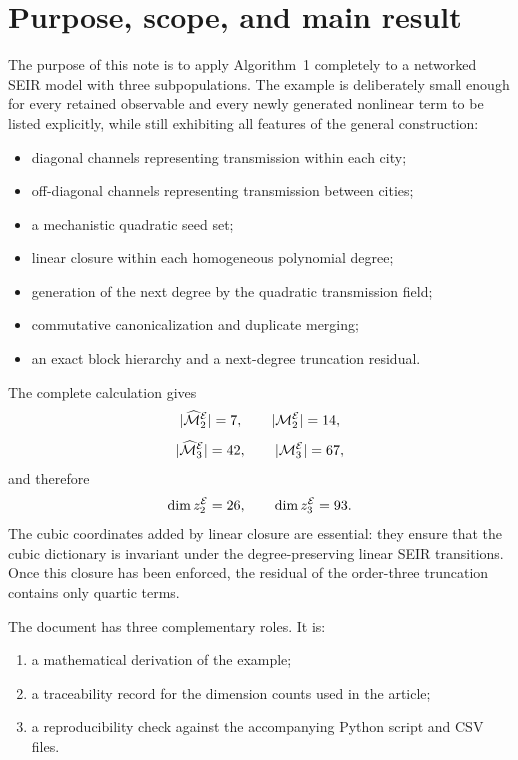 \section{Purpose, scope, and main result}
\label{sec:purpose}

The purpose of this note is to apply Algorithm~1 completely to a networked
SEIR model with three subpopulations. The example is deliberately small enough
for every retained observable and every newly generated nonlinear term to be
listed explicitly, while still exhibiting all features of the general
construction:

\begin{itemize}[leftmargin=2em]
\item diagonal channels representing transmission within each city;
\item off-diagonal channels representing transmission between cities;
\item a mechanistic quadratic seed set;
\item linear closure within each homogeneous polynomial degree;
\item generation of the next degree by the quadratic transmission field;
\item commutative canonicalization and duplicate merging;
\item an exact block hierarchy and a next-degree truncation residual.
\end{itemize}

The complete calculation gives
\[
|\widehat{\mathcal M}_2^{\mathcal{E}}|=7,
\qquad
|\mathcal M_2^{\mathcal{E}}|=14,
\]
\[
|\widehat{\mathcal M}_3^{\mathcal{E}}|=42,
\qquad
|\mathcal M_3^{\mathcal{E}}|=67,
\]
and therefore
\[
\dim z_2^{\mathcal{E}}=26,
\qquad
\dim z_3^{\mathcal{E}}=93.
\]
The \NumMthreeClosure{} cubic coordinates added by linear closure are essential:
they ensure that the cubic dictionary is invariant under the degree-preserving
linear SEIR transitions. Once this closure has been enforced, the residual of
the order-three truncation contains only quartic terms.

The document has three complementary roles. It is:

\begin{enumerate}[leftmargin=2em]
\item a mathematical derivation of the example;
\item a traceability record for the dimension counts used in the article;
\item a reproducibility check against the accompanying Python script and CSV
      files.
\end{enumerate}
